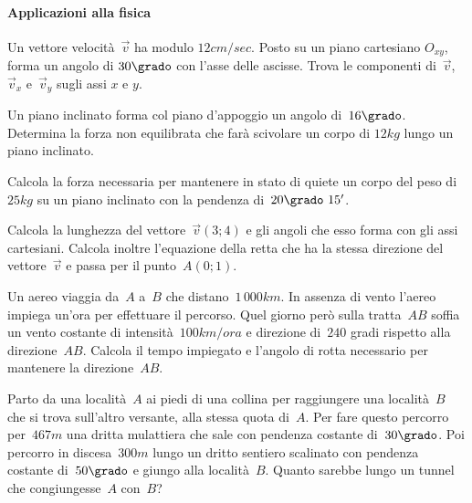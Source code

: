 \paragraph{Applicazioni alla fisica}
\begin{multicols}{2}
\begin{esercizio}
\label{ese:G.37}
Un vettore velocità~$\vec{v}$ ha modulo $12\unit{cm/sec}$. Posto su un piano cartesiano $O_{xy}$, forma un angolo di $30\grado$ con
l'asse delle ascisse. Trova le componenti di~$\vec{v}$, $\vec{v}_x$ e~$\vec{v}_y$ sugli assi $x$ e $y$.
\end{esercizio}

\begin{esercizio}
\label{ese:G.38}
Un piano inclinato forma col piano d'appoggio un angolo di~$16\grado$. Determina la forza non equilibrata che farà scivolare un corpo di
$12\unit{kg}$ lungo un piano inclinato.
\end{esercizio}

\begin{esercizio}
\label{ese:G.39}
Calcola la forza necessaria per mantenere in stato di quiete un corpo del peso di~$25\unit{kg}$ su un piano inclinato con
la pendenza di~$20\grado~15'$.
\end{esercizio}

\begin{esercizio}
\label{ese:G.40}
Calcola la lunghezza del vettore~$\vec{v}(3;4)$ e gli angoli che esso forma con gli assi cartesiani.
Calcola inoltre l'equazione della retta che ha la stessa direzione del vettore~$\vec{v}$ e passa per il punto~$A(0;1)$.
\end{esercizio}

\begin{esercizio}
\label{ese:G.41}
Un aereo viaggia da~$A$ a~$B$ che distano~$1\,000\unit{km}$. In assenza di vento l'aereo impiega un'ora per effettuare il percorso.
Quel giorno però sulla tratta~$AB$ soffia un vento costante di intensità~$100\unit{km/ora}$ e direzione di~$240$ gradi
rispetto alla direzione~$AB$. Calcola il tempo impiegato e l'angolo di rotta necessario per mantenere la direzione~$AB$.
\end{esercizio}


\begin{esercizio}[\Ast]
\label{ese:G.42}
Parto da una località~$A$ ai piedi di una collina per raggiungere una località~$B$ che si trova sull'altro versante,
alla stessa quota di~$A$. Per fare questo percorro per~$467\unit{m}$ una dritta mulattiera che sale con pendenza costante di~$30\grado$.
Poi percorro in discesa~$300\unit{m}$ lungo un dritto sentiero scalinato con pendenza costante di~$50\grado$ e giungo alla località~$B$.
Quanto sarebbe lungo un tunnel che congiungesse~$A$ con~$B$?
\begin{center}
 
\end{center}
\end{esercizio}


\end{multicols}
